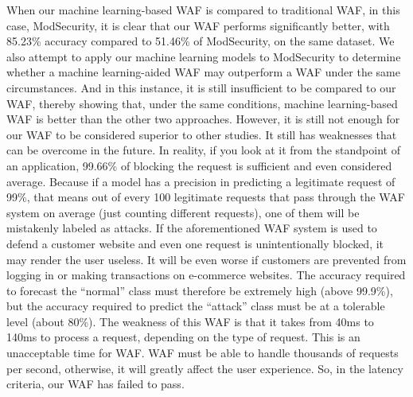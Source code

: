 When our machine learning-based WAF is compared to traditional WAF, in this case, ModSecurity, it is clear that our WAF performs significantly better, with 85.23\% accuracy compared to 51.46\% of ModSecurity, on the same dataset. We also attempt to apply our machine learning models to ModSecurity to determine whether a machine learning-aided WAF may outperform a WAF under the same circumstances. And in this instance, it is still insufficient to be compared to our WAF, thereby showing that, under the same conditions, machine learning-based WAF is better than the other two approaches. However, it is still not enough for our WAF to be considered superior to other studies. It still has weaknesses that can be overcome in the future. In reality, if you look at it from the standpoint of an application, 99.66\% of blocking the request is sufficient and even considered average. Because if a model has a precision in predicting a legitimate request of 99\%, that means out of every 100 legitimate requests that pass through the WAF system on average (just counting different requests), one of them will be mistakenly labeled as attacks. If the aforementioned WAF system is used to defend a customer website and even one request is unintentionally blocked, it may render the user useless. It will be even worse if customers are prevented from logging in or making transactions on e-commerce websites. The accuracy required to forecast the ``normal'' class must therefore be extremely high (above 99.9\%), but the accuracy required to predict the ``attack'' class must be at a tolerable level (about 80\%).
\newpage
The weakness of this WAF is that it takes from 40ms to 140ms to process a request, depending on the type of request. This is an unacceptable time for WAF. WAF must be able to handle thousands of requests per second, otherwise, it will greatly affect the user experience. So, in the latency criteria, our WAF has failed to pass.

	

